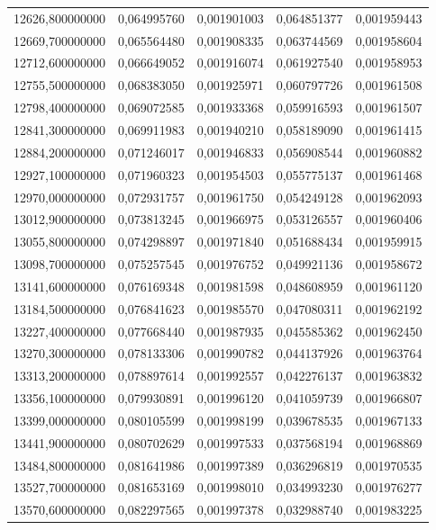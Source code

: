 \begin{longtable}{rrrrr}
12626,800000000 & 0,064995760 & 0,001901003 & 0,064851377 & 0,001959443\\
12669,700000000 & 0,065564480 & 0,001908335 & 0,063744569 & 0,001958604\\
12712,600000000 & 0,066649052 & 0,001916074 & 0,061927540 & 0,001958953\\
12755,500000000 & 0,068383050 & 0,001925971 & 0,060797726 & 0,001961508\\
12798,400000000 & 0,069072585 & 0,001933368 & 0,059916593 & 0,001961507\\
12841,300000000 & 0,069911983 & 0,001940210 & 0,058189090 & 0,001961415\\
12884,200000000 & 0,071246017 & 0,001946833 & 0,056908544 & 0,001960882\\
12927,100000000 & 0,071960323 & 0,001954503 & 0,055775137 & 0,001961468\\
12970,000000000 & 0,072931757 & 0,001961750 & 0,054249128 & 0,001962093\\
13012,900000000 & 0,073813245 & 0,001966975 & 0,053126557 & 0,001960406\\
13055,800000000 & 0,074298897 & 0,001971840 & 0,051688434 & 0,001959915\\
13098,700000000 & 0,075257545 & 0,001976752 & 0,049921136 & 0,001958672\\
13141,600000000 & 0,076169348 & 0,001981598 & 0,048608959 & 0,001961120\\
13184,500000000 & 0,076841623 & 0,001985570 & 0,047080311 & 0,001962192\\
13227,400000000 & 0,077668440 & 0,001987935 & 0,045585362 & 0,001962450\\
13270,300000000 & 0,078133306 & 0,001990782 & 0,044137926 & 0,001963764\\
13313,200000000 & 0,078897614 & 0,001992557 & 0,042276137 & 0,001963832\\
13356,100000000 & 0,079930891 & 0,001996120 & 0,041059739 & 0,001966807\\
13399,000000000 & 0,080105599 & 0,001998199 & 0,039678535 & 0,001967133\\
13441,900000000 & 0,080702629 & 0,001997533 & 0,037568194 & 0,001968869\\
13484,800000000 & 0,081641986 & 0,001997389 & 0,036296819 & 0,001970535\\
13527,700000000 & 0,081653169 & 0,001998010 & 0,034993230 & 0,001976277\\
13570,600000000 & 0,082297565 & 0,001997378 & 0,032988740 & 0,001983225\\

\end{longtable}
